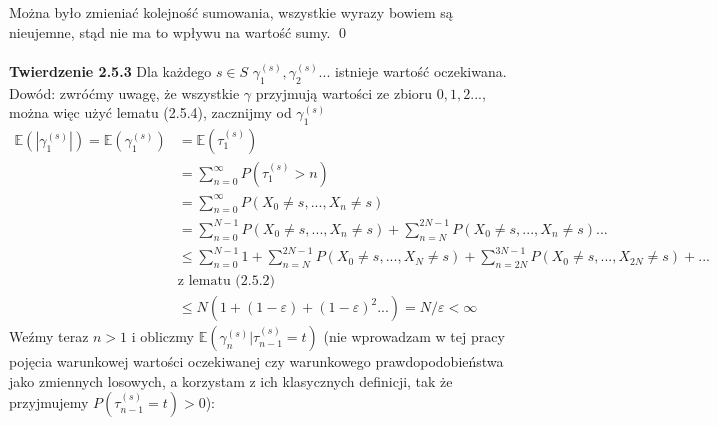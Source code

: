 \documentclass[a4paper]{article}
\begin{document}
Można było zmieniać kolejność sumowania, wszystkie wyrazy bowiem są nieujemne, stąd nie ma to wpływu na wartość sumy. \qed\\
\\
\textbf{Twierdzenie 2.5.3}
Dla każdego $s\in S$ $\gamma_1^{(s)}, \gamma_2^{(s)}...$ istnieje wartość oczekiwana.\\
Dowód: zwróćmy uwagę, że wszystkie $\gamma$ przyjmują wartości ze zbioru $0,1,2...$, można więc użyć lematu (2.5.4), zacznijmy od $\gamma_1^{(s)}$
\begin{align*}
    \mathbb{E}(|\gamma_1^{(s)}|) = \mathbb{E}(\gamma_1^{(s)}) &= \mathbb{E}(\tau_1^{(s)})\\
    &= \sum\limits_{n = 0}^{\infty} P(\tau_1^{(s)} > n) \\
    &= \sum\limits_{n = 0}^{\infty} P(X_0 \neq s,..., X_n \neq s) \\
    &= \sum\limits_{n = 0}^{N-1} P(X_0 \neq s,..., X_n \neq s) + \sum\limits_{n = N}^{2N - 1} P(X_0 \neq s,..., X_n \neq s) ...\\
    &\leq \sum\limits_{n = 0}^{N-1} 1 + \sum\limits_{n = N}^{2N - 1} P(X_0 \neq s,..., X_N \neq s) + \sum\limits_{n = 2N}^{3N - 1} P(X_0 \neq s,..., X_{2N} \neq s)+...\\
    &\text{z lematu (2.5.2)}\\
    &\leq N(1 + (1-\varepsilon) + (1 - \varepsilon)^2 ...) = N/\varepsilon < \infty
\end{align*}
Weźmy teraz $n>1$ i obliczmy $\mathbb{E}(\gamma^{(s)}_n|\tau^{(s)}_{n-1} = t)$ (nie wprowadzam w tej pracy pojęcia warunkowej wartości oczekiwanej czy warunkowego prawdopodobieństwa jako zmiennych losowych, a korzystam z ich klasycznych definicji, tak że przyjmujemy $P(\tau^{(s)}_{n-1} = t) > 0$):
\end{document}

